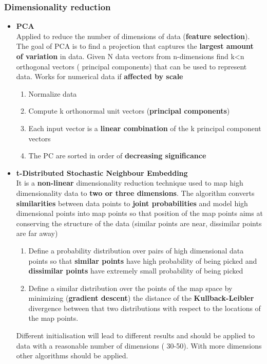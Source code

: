 \subsubsection{Dimensionality reduction}
\begin{itemize}
\item \textbf{PCA}\\
Applied to reduce the number of dimensions of data (\textbf{feature selection}). The goal of PCA is to find a projection that captures the \textbf{largest amount of variation} in data. Given N data vectors from n-dimensions find k<n orthogonal vectors ( principal components) that can be used to represent data. Works for numerical data if \textbf{affected by scale}
\begin{enumerate}
\item Normalize data
\item Compute k orthonormal unit vectors (\textbf{principal components})
\item Each input vector is a \textbf{linear combination }of the k principal component vectors
\item The PC are sorted in order of \textbf{decreasing significance}
\end{enumerate}
\item \textbf{t-Distributed Stochastic Neighbour Embedding}\\
It is a \textbf{non-linear} dimensionality reduction technique used to map high dimensionality data to \textbf{two or three dimensions}. The algorithm converts \textbf{similarities} between data points to \textbf{joint probabilities} and model  high dimensional points into map points so that position of the map points aims at	conserving the structure of the data  (similar points are near, dissimilar points are far away)
\begin{enumerate}
\item Define a probability distribution over pairs of high dimensional data points so that \textbf{similar points} have high probability of being picked and \textbf{dissimilar points} have extremely small probability of being picked
\item Define a similar distribution over the points of the map space by minimizing (\textbf{gradient descent}) the distance of the \textbf{Kullback-Leibler} divergence between that two distributions with respect to the locations of the map points.
\end{enumerate}
Different initialisation will lead to different results and should be applied to data with a reasonable number of dimensions ( 30-50). With more dimensions other algorithms should be applied.
\end{itemize}


